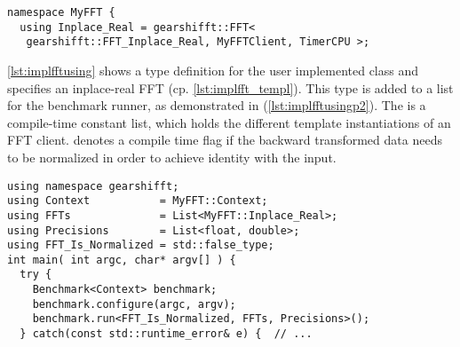 \begin{lstlisting}[caption={Define FFT client types for corresponding FFTs},label={lst:implfftusing}]
namespace MyFFT { 
  using Inplace_Real = gearshifft::FFT<
   gearshifft::FFT_Inplace_Real, MyFFTClient, TimerCPU >;
\end{lstlisting}

\cref{lst:implfftusing} shows a type definition for the user implemented class  and specifies an inplace-real FFT (cp. \cref{lst:implfft_templ}).
This type is added to a list for the benchmark runner, as demonstrated in  (\cref{lst:implfftusingp2}). The  is a compile-time constant list, which holds the different template instantiations of an FFT client.  denotes a compile time flag if the backward transformed data needs to be normalized in order to achieve identity with the input.

\begin{lstlisting}[caption={Using FFT client types to run the benchmarks},label={lst:implfftusingp2}]
using namespace gearshifft;
using Context           = MyFFT::Context;         
using FFTs              = List<MyFFT::Inplace_Real>;
using Precisions        = List<float, double>;   
using FFT_Is_Normalized = std::false_type;
int main( int argc, char* argv[] ) {                                                        
  try {                                                  
    Benchmark<Context> benchmark;
    benchmark.configure(argc, argv);                     
    benchmark.run<FFT_Is_Normalized, FFTs, Precisions>();
  } catch(const std::runtime_error& e) {  // ...
\end{lstlisting}

